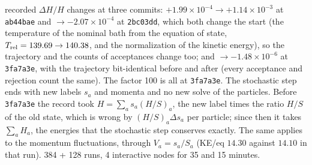 \documentclass[11pt,aps,preprint,nofootinbib,superscriptaddress,tightenlines]{revtex4-2}
\begin{document}
recorded $\Delta H/H$ changes at three commits: $+1.99\times10^{-4}\to+1.14\times10^{-3}$ at \texttt{ab44bae} and $\to-2.07\times10^{-4}$ at
\texttt{2bc03dd}, which both change the start (the temperature of the nominal bath from the equation of state, $T_{\rm rel}=139.69\to140.38$,
and the normalization of the kinetic energy), so the trajectory and the counts of acceptances change too; and $\to-1.48\times10^{-6}$ at
\texttt{3fa7a3e}, with the trajectory bit-identical before and after (every acceptance and rejection count the same).  The factor 100 is all
at \texttt{3fa7a3e}.  The stochastic step
ends with new labels $s_a$ and momenta and no new solve of the particles.  Before \texttt{3fa7a3e} the record took $H=\sum_a s_a(H/S)_a$, the
new label times the ratio $H/S$ of the old state, which is wrong by $(H/S)_a\Delta s_a$ per particle; since then it takes $\sum_aH_a$, the energies
that the stochastic step conserves exactly.  The same applies to the momentum fluctuations, through $V_a=s_a/S_a$ (KE/eq $14.30$ against
$14.10$ in that run).  384 + 128 runs, 4 interactive nodes for 35 and 15 minutes.
\end{document}
